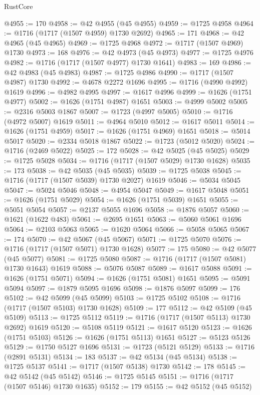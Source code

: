 \begin{lexlean}{RustCore}
\begin{coremodule}
@4955 := 170
@4958 := @42 @4955 (@45 @4955)
@4959 := @1725 @4958
@4964 := @1716 (@1717 (@1507 @4959) @1730 @2692)
@4965 := 171
@4968 := @42 @4965 (@45 @4965)
@4969 := @1725 @4968
@4972 := @1717 (@1507 @4969) @1730
@4973 := 168
@4976 := @42 @4973 (@45 @4973)
@4977 := @1725 @4976
@4982 := @1716 (@1717 (@1507 @4977) @1730 @1641)
@4983 := 169
@4986 := @42 @4983 (@45 @4983)
@4987 := @1725 @4986
@4990 := @1717 (@1507 @4987) @1730
@4992 := @4678 @2272 @1696
@4995 := @1716 (@4990 @4992) @1619
@4996 := @4982 @4995
@4997 := @1617 @4996
@4999 := @1626 (@1751 @4977)
@5002 := @1626 (@1751 @4987) @1651
@5003 := @4999 @5002
@5005 := @2316 @5003 @1867
@5007 := @1723 (@4997 @5005)
@5010 := @1716 (@4972 @5007) @1619
@5011 := @4964 @5010
@5012 := @1617 @5011
@5014 := @1626 (@1751 @4959)
@5017 := @1626 (@1751 @4969) @1651
@5018 := @5014 @5017
@5020 := @2334 @5018 @1867
@5022 := @1723 (@5012 @5020)
@5024 := @1716 (@2469 @5022)
@5025 := 172
@5028 := @42 @5025 (@45 @5025)
@5029 := @1725 @5028
@5034 := @1716 (@1717 (@1507 @5029) @1730 @1628)
@5035 := 173
@5038 := @42 @5035 (@45 @5035)
@5039 := @1725 @5038
@5045 := @1716 (@1717 (@1507 @5039) @1730 @2027) @1619
@5046 := @5034 @5045
@5047 := @5024 @5046
@5048 := @4954 @5047
@5049 := @1617 @5048
@5051 := @1626 (@1751 @5029)
@5054 := @1626 (@1751 @5039) @1651
@5055 := @5051 @5054
@5057 := @2137 @5055 @1696
@5058 := @1876 @5057
@5060 := @1621 (@1622 @483)
@5061 := @2695 @1651
@5063 := @5060 @5061 @1696
@5064 := @2103 @5063
@5065 := @1620 @5064
@5066 := @5058 @5065
@5067 := 174
@5070 := @42 @5067 (@45 @5067)
@5071 := @1725 @5070
@5076 := @1716 (@1717 (@1507 @5071) @1730 @1628)
@5077 := 175
@5080 := @42 @5077 (@45 @5077)
@5081 := @1725 @5080
@5087 := @1716 (@1717 (@1507 @5081) @1730 @1643) @1619
@5088 := @5076 @5087
@5089 := @1617 @5088
@5091 := @1626 (@1751 @5071)
@5094 := @1626 (@1751 @5081) @1651
@5095 := @5091 @5094
@5097 := @1879 @5095 @1696
@5098 := @1876 @5097
@5099 := 176
@5102 := @42 @5099 (@45 @5099)
@5103 := @1725 @5102
@5108 := @1716 (@1717 (@1507 @5103) @1730 @1628)
@5109 := 177
@5112 := @42 @5109 (@45 @5109)
@5113 := @1725 @5112
@5119 := @1716 (@1717 (@1507 @5113) @1730 @2692) @1619
@5120 := @5108 @5119
@5121 := @1617 @5120
@5123 := @1626 (@1751 @5103)
@5126 := @1626 (@1751 @5113) @1651
@5127 := @5123 @5126
@5129 := @1750 @5127 @1696
@5131 := @1723 (@5121 @5129)
@5133 := @1716 (@2891 @5131)
@5134 := 183
@5137 := @42 @5134 (@45 @5134)
@5138 := @1725 @5137
@5141 := @1717 (@1507 @5138) @1730
@5142 := 178
@5145 := @42 @5142 (@45 @5142)
@5146 := @1725 @5145
@5151 := @1716 (@1717 (@1507 @5146) @1730 @1635)
@5152 := 179
@5155 := @42 @5152 (@45 @5152)

\end{coremodule}
\end{lexlean}
